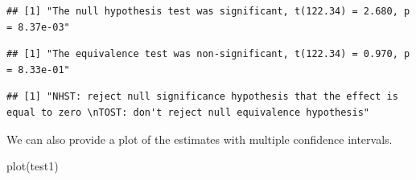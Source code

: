 \documentclass[]{cik}%
\newenvironment{Shaded}{\begin{snugshade}}{\end{snugshade}}
\newcommand{\FunctionTok}[1]{\textcolor[rgb]{0.00,0.00,0.00}{#1}}
\newcommand{\NormalTok}[1]{#1}
\newcommand{\SpecialCharTok}[1]{\textcolor[rgb]{0.00,0.00,0.00}{#1}}
\begin{document}
\begin{verbatim}
## [1] "The null hypothesis test was significant, t(122.34) = 2.680, p = 8.37e-03"
\end{verbatim}

\begin{Shaded}
\end{Shaded}

\begin{verbatim}
## [1] "The equivalence test was non-significant, t(122.34) = 0.970, p = 8.33e-01"
\end{verbatim}

\begin{Shaded}
\end{Shaded}

\begin{verbatim}
## [1] "NHST: reject null significance hypothesis that the effect is equal to zero \nTOST: don't reject null equivalence hypothesis"
\end{verbatim}

\newpage

We can also provide a plot of the estimates with multiple confidence
intervals.

\begin{Shaded}
\begin{Highlighting}[]
\FunctionTok{plot}\NormalTok{(test1)}
\end{Highlighting}
\end{Shaded}
\end{document}
